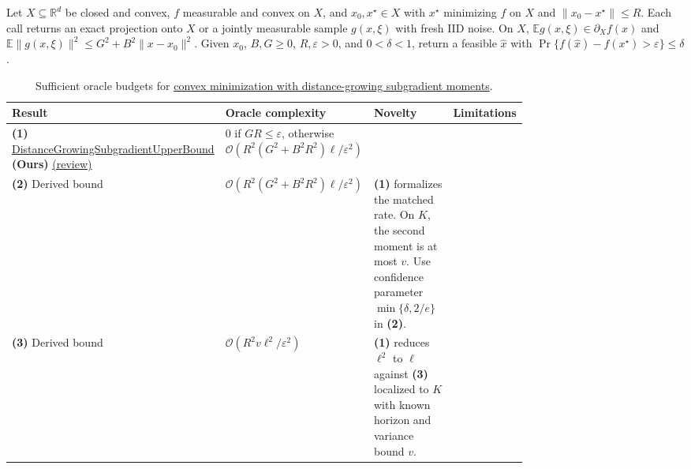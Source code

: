 \begin{table}[tp]
\centering
\caption{Sufficient oracle budgets for \href{https://github.com/k3nfalt/longtails/blob/main/LongTails/Setups/DistanceGrowingSubgradient.lean}{convex minimization with distance-growing subgradient moments}.}\label{tab:DistanceGrowingSubgradient}
\parbox{\linewidth}{\footnotesize Let \(X\subseteq\mathbb R^d\) be closed and convex, \(f\) measurable and convex on \(X\), and \(x_0,x^\star\in X\) with \(x^\star\) minimizing \(f\) on \(X\) and \(\|x_0-x^\star\|\le R\). Each call returns an exact projection onto \(X\) or a jointly measurable sample \(g(x,\xi)\) with fresh IID noise. On \(X\), \(\mathbb E g(x,\xi)\in\partial_X f(x)\) and \(\mathbb E\|g(x,\xi)\|^2\le G^2+B^2\|x-x_0\|^2\). Given \(x_0\), \(B,G\ge0\), \(R,\varepsilon>0\), and \(0<\delta<1\), return a feasible \(\hat x\) with \(\Pr\{f(\hat x)-f(x^\star)>\varepsilon\}\le\delta\).}\par\smallskip
\begin{threeparttable}
\footnotesize
\setlength{\tabcolsep}{4pt}\renewcommand{\arraystretch}{1.25}
\begin{tabularx}{\linewidth}{@{}>{\raggedright\arraybackslash}p{0.20\linewidth}>{\raggedright\arraybackslash}p{0.26\linewidth}>{\raggedright\arraybackslash}p{0.30\linewidth}>{\raggedright\arraybackslash}X@{}}
\toprule
\textbf{Result} & \textbf{Oracle complexity} & \textbf{Novelty} & \textbf{Limitations} \\
\midrule
\textbf{(1)} \href{https://github.com/k3nfalt/longtails/blob/main/LongTails/Theorems/DistanceGrowingSubgradientUpperBound.lean}{Distance\allowbreak Growing\allowbreak Subgradient\allowbreak Upper\allowbreak Bound} \textbf{(Ours)} \href{https://github.com/k3nfalt/longtails/blob/main/scripts/reviews/DistanceGrowingSubgradientUpperBound.md}{(review)}
& \(0\) if \(GR\le\varepsilon\), otherwise \(\mathcal{O}(R^2(G^2+B^2R^2)\ell/\varepsilon^2)\) & & \\
\midrule[1.2pt]
\textbf{(2)} Derived bound \citep[Thm.~2(iii), Cor.~1]{dgsParletta2024}
& \(\mathcal{O}(R^2(G^2+B^2R^2)\ell/\varepsilon^2)\)
& \textbf{(1)} formalizes the matched rate. On \(K\), the second moment is at most \(v\). Use confidence parameter \(\min\{\delta,2/e\}\) in \textbf{(2)}. & \\
\midrule
\textbf{(3)} Derived bound \citep[Thm.~3]{tcLZ2023v3}
& \(\mathcal{O}(R^2 v\ell^2/\varepsilon^2)\)
& \textbf{(1)} reduces \(\ell^2\) to \(\ell\) against \textbf{(3)} localized to \(K\) with known horizon and variance bound \(v\). & \\

\end{tabularx}
\end{threeparttable}
\end{table}

